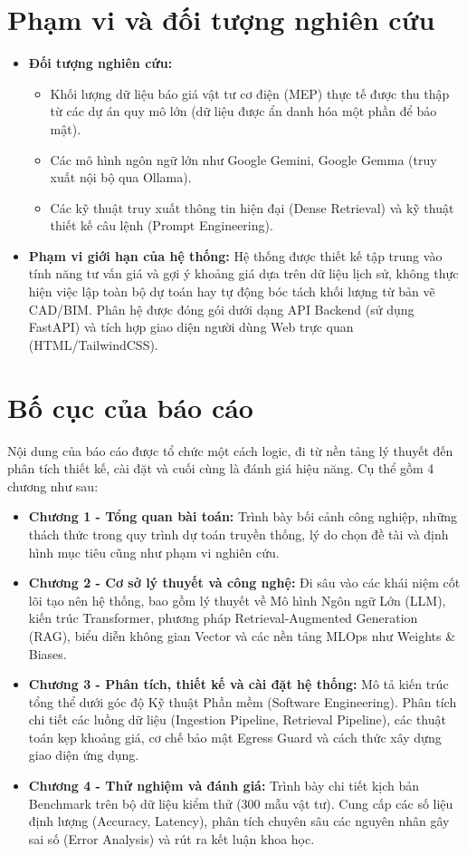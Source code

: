 \section{Phạm vi và đối tượng nghiên cứu}
\begin{itemize}
    \item \textbf{Đối tượng nghiên cứu:} 
    \begin{itemize}
        \item Khối lượng dữ liệu báo giá vật tư cơ điện (MEP) thực tế được thu thập từ các dự án quy mô lớn (dữ liệu được ẩn danh hóa một phần để bảo mật).
        \item Các mô hình ngôn ngữ lớn như Google Gemini, Google Gemma (truy xuất nội bộ qua Ollama).
        \item Các kỹ thuật truy xuất thông tin hiện đại (Dense Retrieval) và kỹ thuật thiết kế câu lệnh (Prompt Engineering).
    \end{itemize}
    \item \textbf{Phạm vi giới hạn của hệ thống:} 
    Hệ thống được thiết kế tập trung vào tính năng tư vấn giá và gợi ý khoảng giá dựa trên dữ liệu lịch sử, không thực hiện việc lập toàn bộ dự toán hay tự động bóc tách khối lượng từ bản vẽ CAD/BIM. Phân hệ được đóng gói dưới dạng API Backend (sử dụng FastAPI) và tích hợp giao diện người dùng Web trực quan (HTML/TailwindCSS).
\end{itemize}

\section{Bố cục của báo cáo}
Nội dung của báo cáo được tổ chức một cách logic, đi từ nền tảng lý thuyết đến phân tích thiết kế, cài đặt và cuối cùng là đánh giá hiệu năng. Cụ thể gồm 4 chương như sau:
\begin{itemize}
    \item \textbf{Chương 1 - Tổng quan bài toán:} Trình bày bối cảnh công nghiệp, những thách thức trong quy trình dự toán truyền thống, lý do chọn đề tài và định hình mục tiêu cũng như phạm vi nghiên cứu.
    \item \textbf{Chương 2 - Cơ sở lý thuyết và công nghệ:} Đi sâu vào các khái niệm cốt lõi tạo nên hệ thống, bao gồm lý thuyết về Mô hình Ngôn ngữ Lớn (LLM), kiến trúc Transformer, phương pháp Retrieval-Augmented Generation (RAG), biểu diễn không gian Vector và các nền tảng MLOps như Weights \& Biases.
    \item \textbf{Chương 3 - Phân tích, thiết kế và cài đặt hệ thống:} Mô tả kiến trúc tổng thể dưới góc độ Kỹ thuật Phần mềm (Software Engineering). Phân tích chi tiết các luồng dữ liệu (Ingestion Pipeline, Retrieval Pipeline), các thuật toán kẹp khoảng giá, cơ chế bảo mật Egress Guard và cách thức xây dựng giao diện ứng dụng.
    \item \textbf{Chương 4 - Thử nghiệm và đánh giá:} Trình bày chi tiết kịch bản Benchmark trên bộ dữ liệu kiểm thử (300 mẫu vật tư). Cung cấp các số liệu định lượng (Accuracy, Latency), phân tích chuyên sâu các nguyên nhân gây sai số (Error Analysis) và rút ra kết luận khoa học.
\end{itemize}
